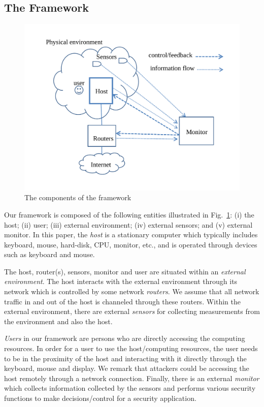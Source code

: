 \subsection{The Framework}
\label{sec:framework}

\begin{figure}
\centering
\includegraphics[width=0.95\columnwidth]{sensor/components}
\caption{The components of the framework} \label{fig:components}
\end{figure}

Our framework is composed of the following
entities illustrated in Fig.~\ref{fig:components}:
(i) the host;
(ii) user;
(iii) external environment;
(iv) external sensors;
and (v) external monitor.
In this paper, the {\em host} is a stationary computer which typically includes
keyboard, mouse, hard-disk, CPU, monitor, etc., and is operated through 
devices such as keyboard and mouse.

The host, router(s), sensors, monitor and user are situated within
an {\em external environment}.
The host interacts with the external environment through its network
which is controlled by some network {\em routers}.
We assume that all network traffic in and out of the host is
channeled through these routers.
Within the external environment, there are external {\em sensors} for
collecting measurements from the environment and also the host.

{\em Users} in our framework are persons who are
directly accessing the computing resources.
In order for a user to use the host/computing resources, the user
needs to be in the proximity of the host and interacting with it directly
through the keyboard, mouse and display.
We remark that attackers could be accessing the host remotely through
a network connection.
Finally, there is an external {\em monitor} which collects information
collected by the sensors and performs various security functions to
make decisions/control for a security application.


